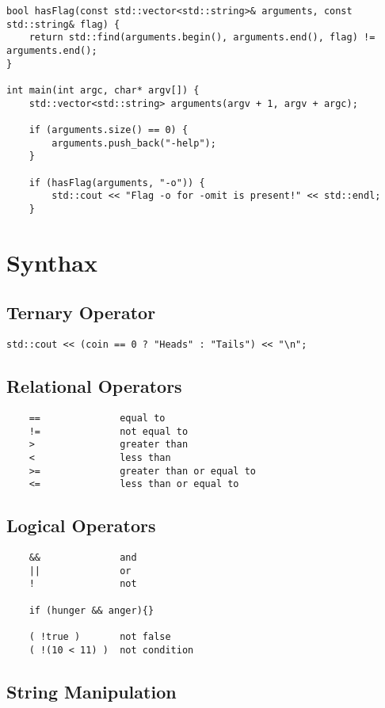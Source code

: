 \documentclass[openany]{report}
\begin{document}
\begin{verbatim}
bool hasFlag(const std::vector<std::string>& arguments, const std::string& flag) {
    return std::find(arguments.begin(), arguments.end(), flag) != arguments.end();
}

int main(int argc, char* argv[]) {
    std::vector<std::string> arguments(argv + 1, argv + argc);

    if (arguments.size() == 0) {
        arguments.push_back("-help");
    }

    if (hasFlag(arguments, "-o")) {
        std::cout << "Flag -o for -omit is present!" << std::endl;
    }
\end{verbatim}

\section{Synthax}
\subsection{Ternary Operator}
\begin{verbatim}
std::cout << (coin == 0 ? "Heads" : "Tails") << "\n";
\end{verbatim}

\subsection{Relational Operators}

\begin{verbatim}
    ==              equal to
    !=              not equal to
    >               greater than
    <               less than
    >=              greater than or equal to
    <=              less than or equal to
\end{verbatim}

\subsection{Logical Operators}

\begin{verbatim}
    &&              and 
    ||              or
    !               not

    if (hunger && anger){}

    ( !true )       not false
    ( !(10 < 11) )  not condition 
\end{verbatim}

\subsection{String Manipulation}
\end{document}
